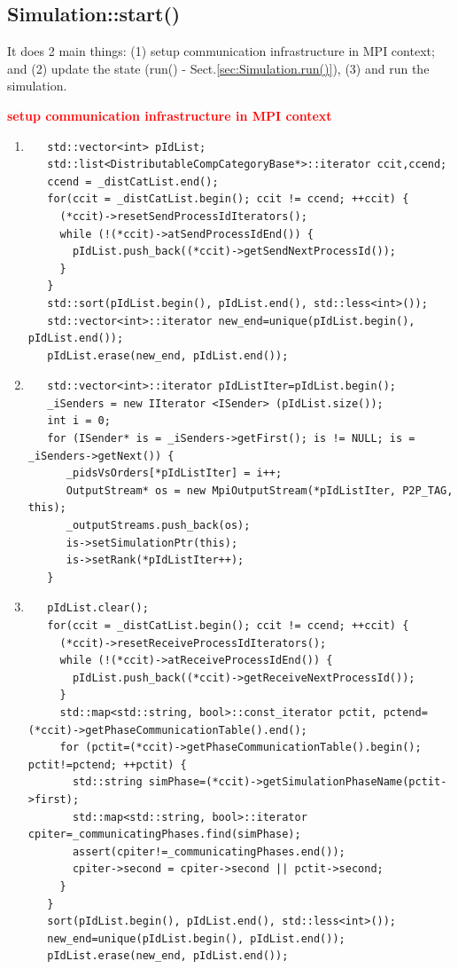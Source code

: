 \subsection{Simulation::start()}
\label{sec:Simulation.start()}

It does 2 main things: (1) setup communication infrastructure in MPI context;
and (2) update the state (run() - Sect.\ref{sec:Simulation.run()}), (3) and run
the simulation.  

\textcolor{red}{\bf setup communication infrastructure in MPI context}
\begin{enumerate}
  \item 

\begin{verbatim}
   std::vector<int> pIdList;
   std::list<DistributableCompCategoryBase*>::iterator ccit,ccend;
   ccend = _distCatList.end();
   for(ccit = _distCatList.begin(); ccit != ccend; ++ccit) {
     (*ccit)->resetSendProcessIdIterators();
     while (!(*ccit)->atSendProcessIdEnd()) {
       pIdList.push_back((*ccit)->getSendNextProcessId());
     }
   }
   std::sort(pIdList.begin(), pIdList.end(), std::less<int>());
   std::vector<int>::iterator new_end=unique(pIdList.begin(), pIdList.end());
   pIdList.erase(new_end, pIdList.end());

\end{verbatim}  
  
  \item 

\begin{verbatim}
   std::vector<int>::iterator pIdListIter=pIdList.begin();
   _iSenders = new IIterator <ISender> (pIdList.size());
   int i = 0;
   for (ISender* is = _iSenders->getFirst(); is != NULL; is = _iSenders->getNext()) {
      _pidsVsOrders[*pIdListIter] = i++;
      OutputStream* os = new MpiOutputStream(*pIdListIter, P2P_TAG, this);
      _outputStreams.push_back(os);
      is->setSimulationPtr(this);
      is->setRank(*pIdListIter++);
   }
\end{verbatim}

  \item 
  
\begin{verbatim}
   pIdList.clear();
   for(ccit = _distCatList.begin(); ccit != ccend; ++ccit) {
     (*ccit)->resetReceiveProcessIdIterators();
     while (!(*ccit)->atReceiveProcessIdEnd()) {
       pIdList.push_back((*ccit)->getReceiveNextProcessId());
     }
     std::map<std::string, bool>::const_iterator pctit, pctend=(*ccit)->getPhaseCommunicationTable().end();
     for (pctit=(*ccit)->getPhaseCommunicationTable().begin(); pctit!=pctend; ++pctit) {
       std::string simPhase=(*ccit)->getSimulationPhaseName(pctit->first); 
       std::map<std::string, bool>::iterator cpiter=_communicatingPhases.find(simPhase);
       assert(cpiter!=_communicatingPhases.end());
       cpiter->second = cpiter->second || pctit->second;
     }
   }
   sort(pIdList.begin(), pIdList.end(), std::less<int>());
   new_end=unique(pIdList.begin(), pIdList.end());
   pIdList.erase(new_end, pIdList.end());
\end{verbatim}



\end{enumerate}
